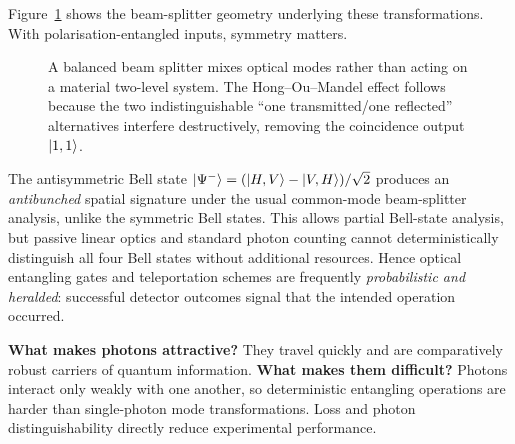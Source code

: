 Figure~\ref{fig:beamsplitter} shows the beam-splitter geometry underlying these transformations. With polarisation-entangled inputs, symmetry matters.

\begin{figure}[t]
\centering
{}
\caption{A balanced beam splitter mixes optical modes rather than acting on a material two-level system. The Hong--Ou--Mandel effect follows because the two indistinguishable ``one transmitted/one reflected'' alternatives interfere destructively, removing the coincidence output $\left\lvert 1,1\right\rangle$.}
\label{fig:beamsplitter}
\end{figure} The antisymmetric Bell state $\left\lvert \Psi^-\right\rangle=(\left\lvert H,V\right\rangle-\left\lvert V,H\right\rangle)/\sqrt2$ produces an \emph{antibunched} spatial signature under the usual common-mode beam-splitter analysis, unlike the symmetric Bell states. This allows partial Bell-state analysis, but passive linear optics and standard photon counting cannot deterministically distinguish all four Bell states without additional resources. Hence optical entangling gates and teleportation schemes are frequently \emph{probabilistic and heralded}: successful detector outcomes signal that the intended operation occurred.

\textbf{What makes photons attractive?} They travel quickly and are comparatively robust carriers of quantum information. \textbf{What makes them difficult?} Photons interact only weakly with one another, so deterministic entangling operations are harder than single-photon mode transformations. Loss and photon distinguishability directly reduce experimental performance.

